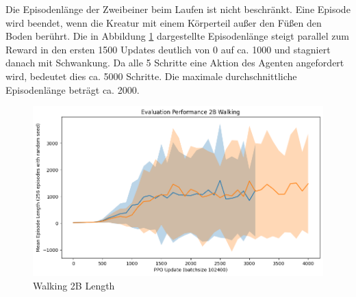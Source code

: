Die Episodenlänge der Zweibeiner beim Laufen ist nicht beschränkt. Eine Episode wird beendet, wenn die Kreatur mit einem Körperteil außer den Füßen den Boden berührt. Die in Abbildung \ref{fig:Walking2B_Length} dargestellte Episodenlänge steigt parallel zum Reward in den ersten 1500 Updates deutlich von 0 auf ca. 1000 und stagniert danach mit Schwankung. Da alle 5 Schritte eine Aktion des Agenten angefordert wird, bedeutet dies ca. 5000 Schritte. Die maximale durchschnittliche Episodenlänge beträgt ca. 2000.

\begin{figure}[ht]
    \centering
    \includegraphics[width=0.5\linewidth]{resources/img/results/Walking2B_Length.png}
    \caption{Walking 2B Length}\label{fig:Walking2B_Length}
\end{figure}

